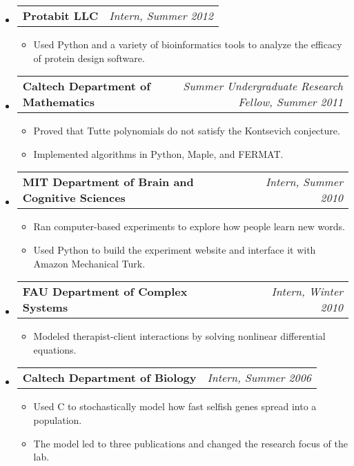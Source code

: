 \documentclass[letterpaper,11pt]{article}
\makeatletter
\newcommand{\resitem}[1]{\item #1 \vspace{-2pt}}
\newcommand{\ressubheading}[4]{
\begin{tabular*}{7.0in}{l@{\extracolsep{\fill}}r}
		\textbf{#1} & \textit{#4} \\
\end{tabular*}\vspace{-6pt}}
\makeatother
\begin{document}
\begin{itemize}


\item
	\ressubheading{Protabit LLC}{Pasadena, CA}{Intern}{Intern, Summer 2012}
	\begin{itemize}
		\resitem{Used Python and a variety of bioinformatics tools to analyze the efficacy of protein design software.}
	\end{itemize}
	

	
\item
	\ressubheading{Caltech Department of Mathematics}{Pasadena, CA}{Summer Undergraduate Research Fellow}{Summer Undergraduate Research Fellow, Summer 2011}
	\begin{itemize}
		\resitem{Proved that Tutte polynomials do not satisfy the Kontsevich conjecture.}
		\resitem{Implemented algorithms in Python, Maple, and FERMAT.}
	\end{itemize}
	
\item
	\ressubheading{MIT Department of Brain and Cognitive Sciences}{Cambridge, MA}{Research Intern}{Intern, Summer 2010}
	\begin{itemize}
		\resitem{Ran computer-based experiments to explore how people learn new words.}
		\resitem{Used Python to build the experiment website and interface it with Amazon Mechanical Turk.}
	\end{itemize}

\item
	\ressubheading{FAU Department of Complex Systems}{Boca Raton, FL}{Research Intern}{Intern, Winter 2010}
	\begin{itemize}
		\resitem{Modeled therapist-client interactions by solving nonlinear differential equations.}
	\end{itemize}

\item
	\ressubheading{Caltech Department of Biology}{Pasadena, CA}{Research Intern}{Intern, Summer 2006}
	\begin{itemize}
		\resitem{Used C to stochastically model how fast selfish genes spread into a population.}
		\resitem{The model led to three publications and changed the research focus of the lab.}
	\end{itemize}

\end{itemize}
\end{document}
